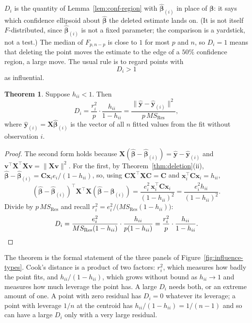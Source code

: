 \documentclass[11pt,a4paper]{article}
\numberwithin{equation}{section}
\theoremstyle{definition}
\newtheorem{thm}{Theorem}[subsection]
\begin{document}
$D_i$ is the quantity of Lemma~\ref{lem:conf-region} with $\hat{\boldsymbol\beta}_{(i)}$ in place
of $\boldsymbol\beta$: it says which confidence ellipsoid about $\hat{\boldsymbol\beta}$ the
deleted estimate lands on. (It is not itself $F$-distributed, since $\hat{\boldsymbol\beta}_{(i)}$
is not a fixed parameter; the comparison is a yardstick, not a test.) The median of
$F_{p, n - p}$ is close to $1$ for most $p$ and $n$, so $D_i = 1$ means that deleting the point
moves the estimate to the edge of a $50\%$ confidence region, a large move. The usual rule is
to regard points with
\[
D_i > 1
\]
as influential.

\begin{thm}\label{thm:cook}
Suppose $h_{ii} < 1$. Then
\[
D_i = \frac{r_i^2}{p}\cdot\frac{h_{ii}}{1 - h_{ii}}
= \frac{\|\hat{\mathbf{y}} - \hat{\mathbf{y}}_{(i)}\|^2}{p\,MS_{\mathrm{Res}}} ,
\]
where $\hat{\mathbf{y}}_{(i)} = \mathbf{X}\hat{\boldsymbol\beta}_{(i)}$ is the vector of all $n$
fitted values from the fit without observation $i$.
\end{thm}

\begin{proof}
The second form holds because
$\mathbf{X}(\hat{\boldsymbol\beta} - \hat{\boldsymbol\beta}_{(i)}) = \hat{\mathbf{y}} - \hat{\mathbf{y}}_{(i)}$
and $\mathbf{v}^\top\mathbf{X}^\top\mathbf{X}\mathbf{v} = \|\mathbf{Xv}\|^2$. For the first, by
Theorem~\ref{thm:deletion}(ii), $\hat{\boldsymbol\beta} - \hat{\boldsymbol\beta}_{(i)} = \mathbf{C}\mathbf{x}_i e_i/(1 - h_{ii})$,
so, using $\mathbf{C}\mathbf{X}^\top\mathbf{X}\mathbf{C} = \mathbf{C}$ and $\mathbf{x}_i^\top\mathbf{C}\mathbf{x}_i = h_{ii}$,
\[
(\hat{\boldsymbol\beta} - \hat{\boldsymbol\beta}_{(i)})^\top\mathbf{X}^\top\mathbf{X}(\hat{\boldsymbol\beta} - \hat{\boldsymbol\beta}_{(i)})
= \frac{e_i^2\,\mathbf{x}_i^\top\mathbf{C}\mathbf{x}_i}{(1 - h_{ii})^2} = \frac{e_i^2 h_{ii}}{(1 - h_{ii})^2} .
\]
Divide by $p\,MS_{\mathrm{Res}}$ and recall $r_i^2 = e_i^2/\bigl(MS_{\mathrm{Res}}(1 - h_{ii})\bigr)$:
\[
D_i = \frac{e_i^2}{MS_{\mathrm{Res}}(1 - h_{ii})}\cdot\frac{h_{ii}}{p(1 - h_{ii})} = \frac{r_i^2}{p}\cdot\frac{h_{ii}}{1 - h_{ii}} . \qedhere
\]
\end{proof}

The theorem is the formal statement of the three panels of
Figure~\ref{fig:influence-types}. Cook's distance is a product of two factors: $r_i^2$, which
measures how badly the point fits, and $h_{ii}/(1 - h_{ii})$, which grows without bound as
$h_{ii} \to 1$ and measures how much leverage the point has. A large $D_i$ needs both, or an
extreme amount of one. A point with zero residual has $D_i = 0$ whatever its leverage; a point
with leverage $1/n$ at the centroid has $h_{ii}/(1 - h_{ii}) = 1/(n - 1)$ and so can have a
large $D_i$ only with a very large residual.
\end{document}

